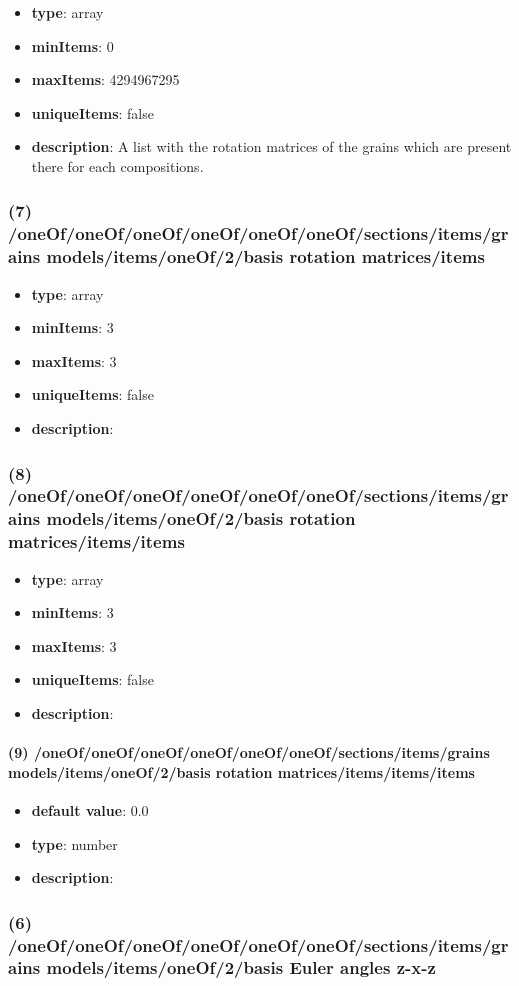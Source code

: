 \begin{itemize}[leftmargin=6em]\item {\bf type}: array
\item {\bf minItems}: 0
\item {\bf maxItems}: 4294967295
\item {\bf uniqueItems}: false
\item {\bf description}: A list with the rotation matrices of the grains which are present there for each compositions.
\end{itemize}\subsubsection{(7) /oneOf/oneOf/oneOf/oneOf/oneOf/oneOf/sections/items/grains models/items/oneOf/2/basis rotation matrices/items}
\begin{itemize}[leftmargin=7em]\item {\bf type}: array
\item {\bf minItems}: 3
\item {\bf maxItems}: 3
\item {\bf uniqueItems}: false
\item {\bf description}: 
\end{itemize}\subsubsection{(8) /oneOf/oneOf/oneOf/oneOf/oneOf/oneOf/sections/items/grains models/items/oneOf/2/basis rotation matrices/items/items}
\begin{itemize}[leftmargin=8em]\item {\bf type}: array
\item {\bf minItems}: 3
\item {\bf maxItems}: 3
\item {\bf uniqueItems}: false
\item {\bf description}: 
\end{itemize}\paragraph{(9) /oneOf/oneOf/oneOf/oneOf/oneOf/oneOf/sections/items/grains models/items/oneOf/2/basis rotation matrices/items/items/items}
\begin{itemize}[leftmargin=9em]\item {\bf default value}: 0.0
\item {\bf type}: number
\item {\bf description}: 
\end{itemize}\subsubsection{(6) /oneOf/oneOf/oneOf/oneOf/oneOf/oneOf/sections/items/grains models/items/oneOf/2/basis Euler angles z-x-z}
